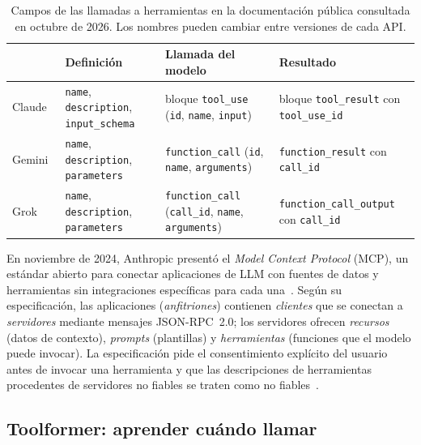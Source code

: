 \begin{table}[h]
\centering\small
\begin{tabularx}{\textwidth}{@{}l>{\raggedright\arraybackslash}X>{\raggedright\arraybackslash}X>{\raggedright\arraybackslash}X@{}}
\toprule
& Definición & Llamada del modelo & Resultado \\
\midrule
Claude~\cite{claude-tools} & \texttt{name}, \texttt{description}, \texttt{input\_schema} & bloque \texttt{tool\_use} (\texttt{id}, \texttt{name}, \texttt{input}) & bloque \texttt{tool\_result} con \texttt{tool\_use\_id} \\
Gemini~\cite{gemini-fc} & \texttt{name}, \texttt{description}, \texttt{parameters} & \texttt{function\_call} (\texttt{id}, \texttt{name}, \texttt{arguments}) & \texttt{function\_result} con \texttt{call\_id} \\
Grok~\cite{xai-fc} & \texttt{name}, \texttt{description}, \texttt{parameters} & \texttt{function\_call} (\texttt{call\_id}, \texttt{name}, \texttt{arguments}) & \texttt{function\_call\_output} con \texttt{call\_id} \\
\bottomrule
\end{tabularx}
\caption{Campos de las llamadas a herramientas en la documentación pública consultada en octubre de 2026. Los nombres pueden cambiar entre versiones de cada API.}
\label{tab:apis}
\end{table}

\begin{observacion}
En noviembre de 2024, Anthropic presentó el \emph{Model Context Protocol} (MCP), un estándar abierto para conectar aplicaciones de LLM con fuentes de datos y herramientas sin integraciones específicas para cada una~\cite{mcp}. Según su especificación, las aplicaciones (\emph{anfitriones}) contienen \emph{clientes} que se conectan a \emph{servidores} mediante mensajes JSON-RPC~2.0; los servidores ofrecen \emph{recursos} (datos de contexto), \emph{prompts} (plantillas) y \emph{herramientas} (funciones que el modelo puede invocar). La especificación pide el consentimiento explícito del usuario antes de invocar una herramienta y que las descripciones de herramientas procedentes de servidores no fiables se traten como no fiables~\cite{mcp-spec}.
\end{observacion}

\subsection{Toolformer: aprender cuándo llamar}

